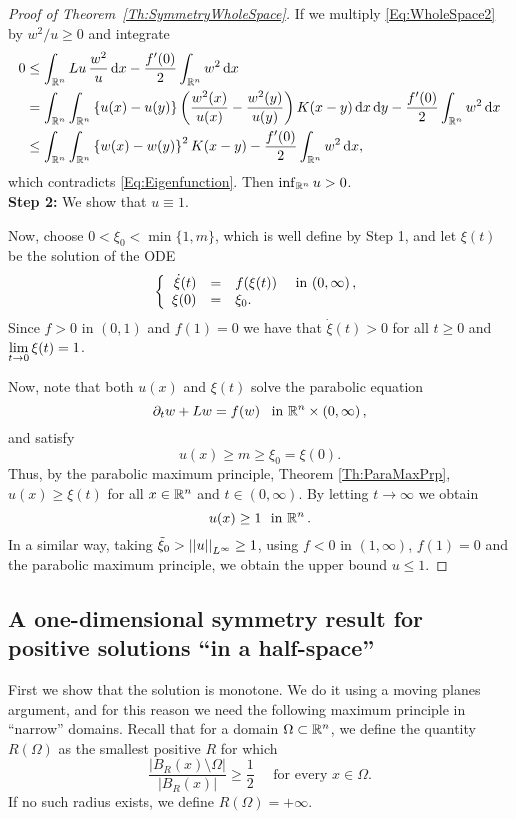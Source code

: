 \begin{proof}[Proof of Theorem~\ref{Th:SymmetryWholeSpace}]
If we multiply \eqref{Eq:WholeSpace2} by $w^2/u\geq 0$ and integrate
\begin{align*}
0 &\leq \int_{\mathbb{R}^n} Lu\,\frac{w^2}{u} \,\mathrm{d} x - \frac{f'(0)}{2}\int_{\mathbb{R}^n} w^2 \,\mathrm{d} x \\
&= \int_{\mathbb{R}^n}\int_{\mathbb{R}^n}\left\{ u(x)-u(y) \right\} \left( \frac{w^2(x)}{u(x)}-\frac{w^2(y)}{u(y)} \right) K(x-y) \,\mathrm{d} x \,\mathrm{d} y - \frac{f'(0)}{2}\int_{\mathbb{R}^n} w^2 \,\mathrm{d} x \\
&\leq \int_{\mathbb{R}^n}\int_{\mathbb{R}^n} \left\{ w(x)-w(y)\right\}^2 K(x-y) - \frac{f'(0)}{2}\int_{\mathbb{R}^n} w^2 \,\mathrm{d} x ,
\end{align*}
which contradicts \eqref{Eq:Eigenfunction}. Then $\inf_{\mathbb{R}^n} u >0$.\\

\textbf{Step 2:} We show that $u\equiv 1$.

Now, choose $0<\xi_0<\min\{1,m\}$, which is well define by Step 1, and let $\xi(t)$ be the solution of the ODE
$$
\left\{\begin{array}{rcll}
\dot{\xi}(t) &=& f(\xi(t)) & \textrm{ in }(0,\infty)\,,\\
\xi(0) &=& \xi_0.
\end{array} \right.
$$
Since $f>0$ in $(0,1)$ and $f(1) = 0$ we have that $\dot{\xi}(t)>0$ for all $t\geq 0$ and $\displaystyle \lim_{t\to 0} \xi(t) = 1$.

Now, note that both $u(x)$ and $\xi(t)$ solve the parabolic equation
$$ \partial_t w + Lw = f(w) \,\,\, \textrm{ in }\mathbb{R}^n\times (0,\infty)\,, $$
and satisfy
$$ u(x) \geq m \geq \xi_0 = \xi(0). $$
Thus, by the parabolic maximum principle, Theorem \ref{Th:ParaMaxPrp}, $u(x)\geq \xi(t)$ for all $x\in\mathbb{R}^n$ and $t\in(0,\infty)$. By letting $t \to \infty$ we obtain
$$ u(x) \geq 1 \,\, \textrm{ in }\mathbb{R}^n\,.  $$
In a similar way, taking $\tilde{\xi}_0>\left | \left |{u} \right | \right |_{L^\infty} \geq 1$, using $f<0$ in $(1,\infty)$, $f(1)=0$ and the parabolic maximum principle, we obtain the upper bound $u\leq 1$.

\end{proof}



\subsection{A one-dimensional symmetry result for positive solutions ``in a half-space''}


First we show that the solution is monotone. We do it using a moving planes argument, and for this reason we need the following maximum principle in ``narrow'' domains. Recall that for a domain $\Omega \subset \mathbb{R}^n$, we define the quantity $R(\Omega)$ as the smallest positive $R$ for which
$$
\dfrac{|B_R(x)\setminus \Omega|}{|B_R(x)|}\geq \dfrac{1}{2} \quad \text{ for every } x \in \Omega.
$$
If no such radius exists, we define $R(\Omega) = +\infty$.

